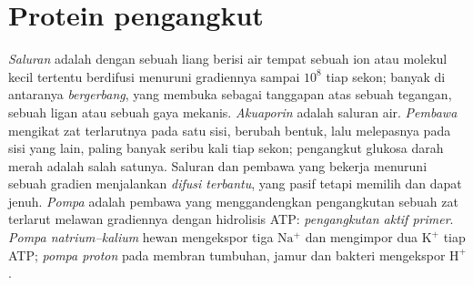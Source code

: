 \section{Protein pengangkut}

\begin{definition}\label{def:b1:membranes-transport:transporters}
\emph{Saluran} adalah  dengan sebuah
liang berisi air tempat sebuah ion atau molekul kecil tertentu
berdifusi menuruni gradiennya sampai $10^8$ tiap sekon; banyak di
antaranya \emph{bergerbang}, yang membuka sebagai tanggapan atas sebuah
tegangan, sebuah ligan atau sebuah gaya mekanis.
\emph{Akuaporin} adalah saluran air.
\emph{Pembawa} mengikat zat terlarutnya pada satu sisi,
berubah bentuk, lalu melepasnya pada sisi yang lain, paling banyak
seribu kali tiap sekon; pengangkut glukosa  darah merah adalah
salah satunya. Saluran dan pembawa yang bekerja menuruni sebuah gradien
menjalankan \emph{difusi terbantu}, yang pasif
tetapi memilih dan dapat jenuh. \emph{Pompa} adalah pembawa
yang menggandengkan pengangkutan sebuah zat terlarut melawan gradiennya
dengan hidrolisis ATP: \emph{pengangkutan aktif
primer}. \emph{Pompa natrium--kalium}
 hewan mengekspor tiga $\mathrm{Na^+}$ dan mengimpor
dua $\mathrm{K^+}$ tiap ATP; \emph{pompa proton} pada membran tumbuhan,
jamur dan bakteri mengekspor $\mathrm{H^+}$.
\end{definition}

